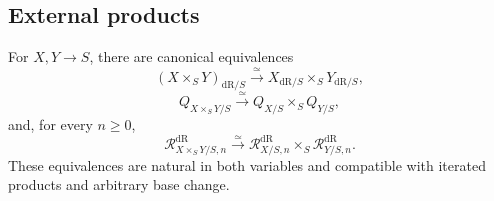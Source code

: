 \subsection{External products}
\label{subsec:external-products-detail}

\begin{proposition}
\label{prop:de-Rham-product-compatibility}
For \(X,Y\to S\), there are canonical equivalences
\[
  (X\times_SY)_{\mathrm{dR}/S}
  \xrightarrow{\simeq}
  X_{\mathrm{dR}/S}\times_SY_{\mathrm{dR}/S},
\]
\[
  Q_{X\times_SY/S}
  \xrightarrow{\simeq}
  Q_{X/S}\times_SQ_{Y/S},
\]
and, for every \(n\geq0\),
\[
  \mathcal R^{\mathrm{dR}}_{X\times_SY/S,n}
  \xrightarrow{\simeq}
  \mathcal R^{\mathrm{dR}}_{X/S,n}
  \times_S
  \mathcal R^{\mathrm{dR}}_{Y/S,n}.
\]
These equivalences are natural in both variables and compatible with iterated
products and arbitrary base change.
\end{proposition}

